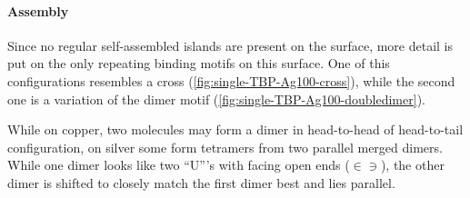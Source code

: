 	\paragraph{Assembly}
	Since no regular self-assembled islands are present on the surface, more detail is put on the only repeating binding motifs on this surface. One of this configurations resembles a cross (\autoref{fig:single-TBP-Ag100-cross}), while the second one is a variation of the dimer motif (\autoref{fig:single-TBP-Ag100-doubledimer}).
	
	
	While on copper, two molecules may form a dimer in head-to-head of head-to-tail configuration, on silver some form tetramers from two parallel merged dimers. While one dimer looks like two ``U'''s with facing open ends ($\in \ni$), the other dimer is shifted to closely match the first dimer best and lies parallel.
	
	
